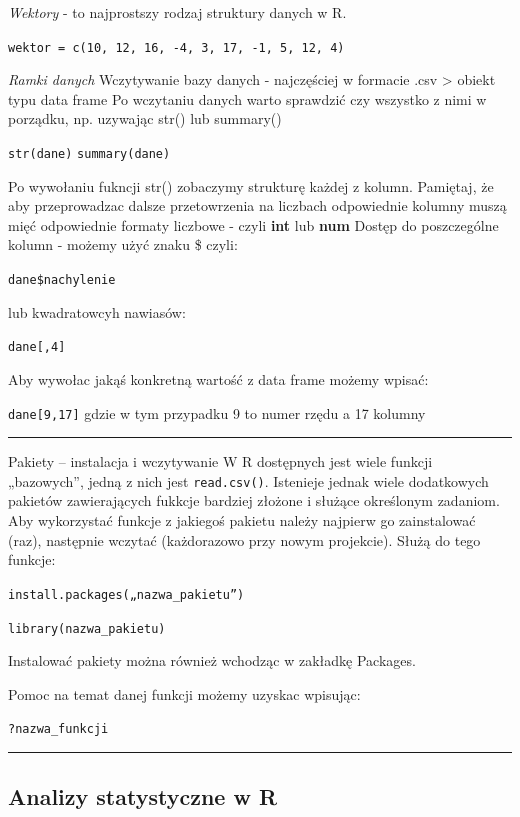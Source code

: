 \documentclass[]{article}
\begin{document}
\emph{Wektory} - to najprostszy rodzaj struktury danych w R.

\texttt{wektor\ =\ c(10,\ 12,\ 16,\ -4,\ 3,\ 17,\ -1,\ 5,\ 12,\ 4)}

\emph{Ramki danych} Wczytywanie bazy danych - najczęściej w formacie
.csv \textgreater{} obiekt typu data frame Po wczytaniu danych warto
sprawdzić czy wszystko z nimi w porządku, np. uzywając str() lub
summary()

\texttt{str(dane)} \texttt{summary(dane)}

Po wywołaniu fukncji str() zobaczymy strukturę każdej z kolumn.
Pamiętaj, że aby przeprowadzac dalsze przetowrzenia na liczbach
odpowiednie kolumny muszą mięć odpowiednie formaty liczbowe - czyli
\textbf{int} lub \textbf{num} Dostęp do poszczególne kolumn - możemy
użyć znaku \$ czyli:

\texttt{dane\$nachylenie}

lub kwadratowcyh nawiasów:

\texttt{dane{[},4{]}}

Aby wywołac jakąś konkretną wartość z data frame możemy wpisać:

\texttt{dane{[}9,17{]}} gdzie w tym przypadku 9 to numer rzędu a 17
kolumny

\begin{center}\rule{0.5\linewidth}{\linethickness}\end{center}

Pakiety -- instalacja i wczytywanie W R dostępnych jest wiele funkcji
„bazowych'', jedną z nich jest \texttt{read.csv()}. Istenieje jednak
wiele dodatkowych pakietów zawierających fukkcje bardziej złożone i
służące określonym zadaniom. Aby wykorzystać funkcje z jakiegoś pakietu
należy najpierw go zainstalować (raz), następnie wczytać (każdorazowo
przy nowym projekcie). Służą do tego funkcje:

\texttt{install.packages(„nazwa\_pakietu”)}

\texttt{library(nazwa\_pakietu)}

Instalować pakiety można również wchodząc w zakładkę Packages.

Pomoc na temat danej funkcji możemy uzyskac wpisując:

\texttt{?nazwa\_funkcji}

\begin{center}\rule{0.5\linewidth}{\linethickness}\end{center}

\subsection{Analizy statystyczne w R}\label{analizy-statystyczne-w-r}
\end{document}
